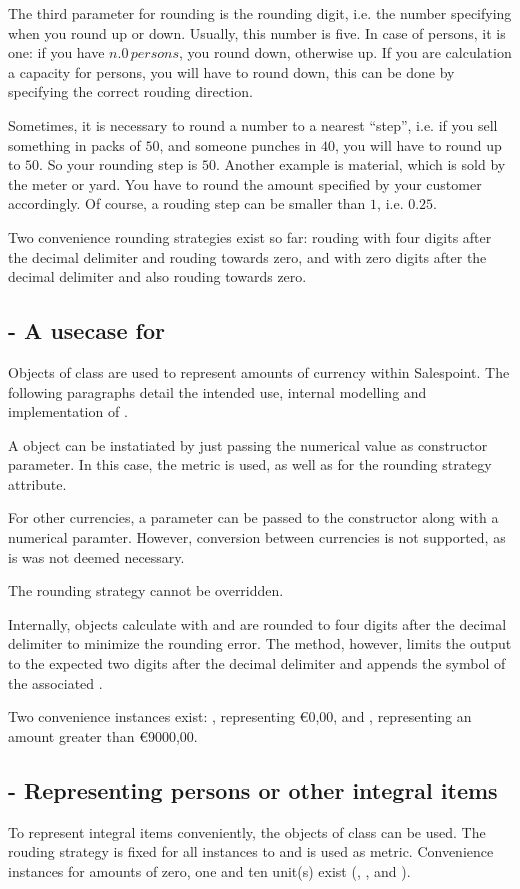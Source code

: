 The third parameter for rounding is the rounding digit, i.e. the number specifying when you round up or down.
Usually, this number is five.
In case of persons, it is one: if you have $n.0\,persons$, you round down, otherwise up.
If you are calculation a capacity for persons, you will have to round down, this can be done by specifying the correct rouding direction.

Sometimes, it is necessary to round a number to a nearest ``step'', i.e. if you sell something in packs of $50$, and someone punches in $40$, you will have to round up to $50$.
So your rounding step is $50$.
Another example is material, which is sold by the meter or yard.
You have to round the amount specified by your customer accordingly.
Of course, a rouding step can be smaller than $1$, i.e. $0.25$.

Two convenience rounding strategies exist so far:  rouding with four digits after the decimal delimiter and rouding towards zero, and  with zero digits after the decimal delimiter and also rouding towards zero.

\subsection{ - A usecase for }
Objects of class  are used to represent amounts of currency within Salespoint.
The following paragraphs detail the intended use, internal modelling and implementation of .

A  object can be instatiated by just passing the numerical value as constructor parameter.
In this case, the metric  is used, as well as  for the rounding strategy attribute.

For other currencies, a  parameter can be passed to the constructor along with a numerical paramter.
However, conversion between currencies is not supported, as is was not deemed necessary.

The rounding strategy cannot be overridden.

Internally,  objects calculate with and are rounded to four digits after the decimal delimiter to minimize the rounding error.
The  method, however, limits the output to the expected two digits after the decimal delimiter and appends the symbol of the associated .

Two convenience instances exist: , representing \euro{0,00}, and , representing an amount greater than \euro{9000,00}.

\subsection{ - Representing persons or other integral items}
To represent integral items conveniently, the objects of class  can be used.
The rouding strategy is fixed for all instances to  and  is used as metric.
Convenience instances for amounts of zero, one and ten unit(s) exist (, , and ).
